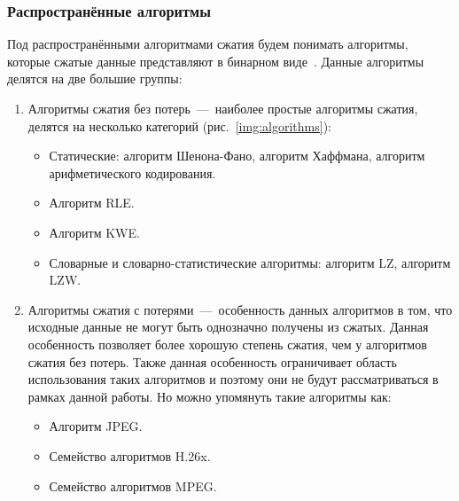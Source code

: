 \documentclass[oneside,final,12pt]{extarticle}
\begin{document}
        \subsubsection{Распространённые алгоритмы}
            Под распространёнными алгоритмами сжатия будем понимать алгоритмы, 
            которые сжатые данные представляют в бинарном виде~\cite{kodituwakku2010comparison}. 
            Данные алгоритмы делятся на две большие группы:
            \begin{enumerate}
                \item Алгоритмы сжатия без потерь~---~наиболее простые алгоритмы сжатия, делятся на несколько категорий (рис.~\ref{img:algorithms}):
                    \begin{itemize}
                    \item Статические: алгоритм Шенона-Фано, алгоритм Хаффмана, алгоритм арифметического кодирования.
                    \item Алгоритм RLE.
                    \item Алгоритм KWE.
                    \item Словарные и словарно-статистические алгоритмы: алгоритм LZ, алгоритм LZW.
                    \end{itemize}
                \item Алгоритмы сжатия с потерями~---~особенность данных алгоритмов в том, что исходные данные не могут быть однозначно
                    получены из сжатых. Данная особенность позволяет более хорошую степень сжатия, чем у алгоритмов сжатия без потерь.
                    Также данная особенность ограничивает область использования таких алгоритмов и поэтому они не будут рассматриваться в рамках данной работы. 
                    Но можно упомянуть такие алгоритмы как:
                    \begin{itemize}
                    \item Алгоритм JPEG.
                    \item Семейство алгоритмов H.26x.
                    \item Семейство алгоритмов MPEG.
                    \end{itemize}
            \end{enumerate}
            
\end{document}
